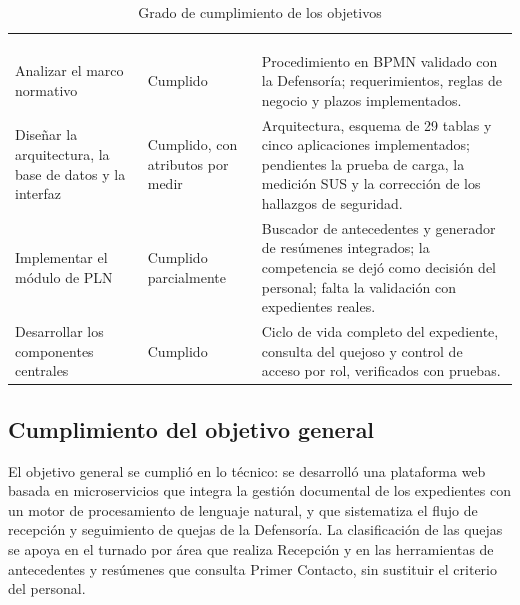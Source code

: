 \small
\renewcommand{\arraystretch}{1.2}
\setlength{\tabcolsep}{4pt}
\begin{longtable}{|L{4.2cm}|L{2.6cm}|L{8.8cm}|}
	\hiderowcolors\caption{Grado de cumplimiento de los objetivos}
	\label{tab:cumplimiento} \\ \showrowcolors
	\hline
	 &  &  \\
	\hline
	\endfirsthead
	\hline
	 &  &  \\
	\hline
	\endhead
	Analizar el marco normativo & Cumplido & Procedimiento en BPMN validado con la Defensoría; requerimientos, reglas de negocio y plazos implementados. \\ \hline
	Diseñar la arquitectura, la base de datos y la interfaz & Cumplido, con atributos por medir & Arquitectura, esquema de 29 tablas y cinco aplicaciones implementados; pendientes la prueba de carga, la medición SUS y la corrección de los hallazgos de seguridad. \\ \hline
	Implementar el módulo de PLN & Cumplido parcialmente & Buscador de antecedentes y generador de resúmenes integrados; la competencia se dejó como decisión del personal; falta la validación con expedientes reales. \\ \hline
	Desarrollar los componentes centrales & Cumplido & Ciclo de vida completo del expediente, consulta del quejoso y control de acceso por rol, verificados con pruebas. \\ \hline
\end{longtable}
\normalsize
\setlength{\tabcolsep}{6pt}
\renewcommand{\arraystretch}{1}

\subsection*{Cumplimiento del objetivo general}

El objetivo general se cumplió en lo técnico: se desarrolló una plataforma web basada en microservicios que integra la gestión documental de los expedientes con un motor de procesamiento de lenguaje natural, y que sistematiza el flujo de recepción y seguimiento de quejas de la Defensoría. La clasificación de las quejas se apoya en el turnado por área que realiza Recepción y en las herramientas de antecedentes y resúmenes que consulta Primer Contacto, sin sustituir el criterio del personal.

